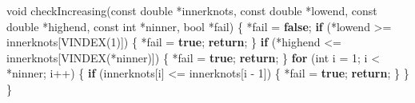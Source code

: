 \documentclass[
  12pt,
  letterpaper,
  DIV=11,
  numbers=noendperiod]{scrreprt}
\newenvironment{Shaded}{\begin{snugshade}}{\end{snugshade}}
\newcommand{\ControlFlowTok}[1]{\textcolor[rgb]{0.00,0.23,0.31}{\textbf{#1}}}
\newcommand{\DataTypeTok}[1]{\textcolor[rgb]{0.68,0.00,0.00}{#1}}
\newcommand{\DecValTok}[1]{\textcolor[rgb]{0.68,0.00,0.00}{#1}}
\newcommand{\KeywordTok}[1]{\textcolor[rgb]{0.00,0.23,0.31}{\textbf{#1}}}
\newcommand{\NormalTok}[1]{\textcolor[rgb]{0.00,0.23,0.31}{#1}}
\newcommand{\OperatorTok}[1]{\textcolor[rgb]{0.37,0.37,0.37}{#1}}
\theoremstyle{remark}
\begin{document}
\begin{Shaded}
\begin{Highlighting}[]
\DataTypeTok{void}\NormalTok{ checkIncreasing}\OperatorTok{(}\DataTypeTok{const} \DataTypeTok{double} \OperatorTok{*}\NormalTok{innerknots}\OperatorTok{,} \DataTypeTok{const} \DataTypeTok{double} \OperatorTok{*}\NormalTok{lowend}\OperatorTok{,}
                     \DataTypeTok{const} \DataTypeTok{double} \OperatorTok{*}\NormalTok{highend}\OperatorTok{,} \DataTypeTok{const} \DataTypeTok{int} \OperatorTok{*}\NormalTok{ninner}\OperatorTok{,} \DataTypeTok{bool} \OperatorTok{*}\NormalTok{fail}\OperatorTok{)} \OperatorTok{\{}
    \OperatorTok{*}\NormalTok{fail }\OperatorTok{=} \KeywordTok{false}\OperatorTok{;}
    \ControlFlowTok{if} \OperatorTok{(*}\NormalTok{lowend }\OperatorTok{\textgreater{}=}\NormalTok{ innerknots}\OperatorTok{[}\NormalTok{VINDEX}\OperatorTok{(}\DecValTok{1}\OperatorTok{)])} \OperatorTok{\{}
        \OperatorTok{*}\NormalTok{fail }\OperatorTok{=} \KeywordTok{true}\OperatorTok{;}
        \ControlFlowTok{return}\OperatorTok{;}
    \OperatorTok{\}}
    \ControlFlowTok{if} \OperatorTok{(*}\NormalTok{highend }\OperatorTok{\textless{}=}\NormalTok{ innerknots}\OperatorTok{[}\NormalTok{VINDEX}\OperatorTok{(*}\NormalTok{ninner}\OperatorTok{)])} \OperatorTok{\{}
        \OperatorTok{*}\NormalTok{fail }\OperatorTok{=} \KeywordTok{true}\OperatorTok{;}
        \ControlFlowTok{return}\OperatorTok{;}
    \OperatorTok{\}}
    \ControlFlowTok{for} \OperatorTok{(}\DataTypeTok{int}\NormalTok{ i }\OperatorTok{=} \DecValTok{1}\OperatorTok{;}\NormalTok{ i }\OperatorTok{\textless{}} \OperatorTok{*}\NormalTok{ninner}\OperatorTok{;}\NormalTok{ i}\OperatorTok{++)} \OperatorTok{\{}
        \ControlFlowTok{if} \OperatorTok{(}\NormalTok{innerknots}\OperatorTok{[}\NormalTok{i}\OperatorTok{]} \OperatorTok{\textless{}=}\NormalTok{ innerknots}\OperatorTok{[}\NormalTok{i }\OperatorTok{{-}} \DecValTok{1}\OperatorTok{])} \OperatorTok{\{}
            \OperatorTok{*}\NormalTok{fail }\OperatorTok{=} \KeywordTok{true}\OperatorTok{;}
            \ControlFlowTok{return}\OperatorTok{;}
        \OperatorTok{\}}
    \OperatorTok{\}}
\OperatorTok{\}}


\end{Highlighting}
\end{Shaded}
\end{document}
